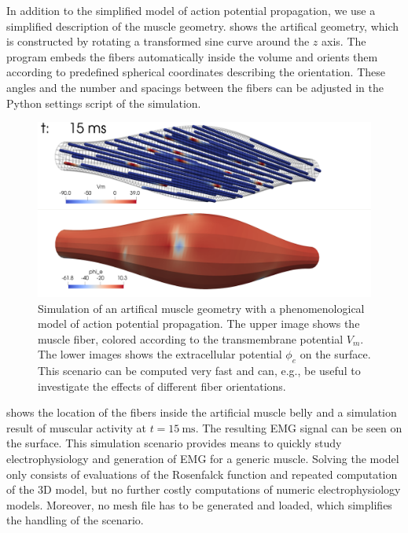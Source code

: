 In addition to the simplified model of action potential propagation, we use a simplified description of the muscle geometry.  shows the artifical geometry, which is constructed by rotating a transformed sine curve around the $z$ axis. 
The program embeds the fibers automatically inside the volume and orients them according to predefined spherical coordinates describing the orientation. These angles and the number and spacings between the fibers can be adjusted in the Python settings script of the simulation.

\begin{figure}
  \centering%
  \includegraphics[width=\textwidth]{images/results/application/custom_geometry.png}%
  \caption{Simulation of an artifical muscle geometry with a phenomenological model of action potential propagation. The upper image shows the muscle fiber, colored according to the transmembrane potential $V_m$. The lower images shows the extracellular potential $\phi_e$ on the surface.
  This scenario can be computed very fast and can, e.g., be useful to investigate the effects of different fiber orientations.}%
  \label{fig:custom_geometry}%
\end{figure}

 shows the location of the fibers inside the artificial muscle belly and a simulation result of muscular activity  at $t=\SI{15}{\ms}$. The resulting EMG signal can be seen on the surface.
This simulation scenario provides means to quickly study electrophysiology and generation of EMG for a generic muscle. Solving the model only consists of evaluations of the Rosenfalck function and repeated computation of the 3D model, but no further costly computations of numeric electrophysiology models. Moreover, no mesh file has to be generated and loaded, which simplifies the handling of the scenario.

